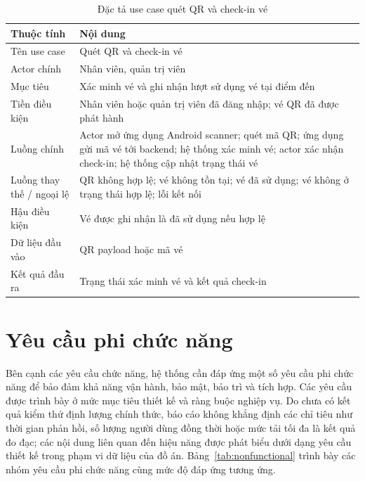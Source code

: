 ﻿\documentclass[../DoAn.tex]{subfiles}
\begin{document}
\begin{table}[H]
\centering
\caption{Đặc tả use case quét QR và check-in vé}
\label{tab:uc-checkin}
\small
\renewcommand{\arraystretch}{1.15}
\setlength{\tabcolsep}{4pt}
\begin{tabularx}{\textwidth}{|L{3.4cm}|Y|}
\hline
\textbf{Thuộc tính} & \textbf{Nội dung} \\
\hline
Tên use case & Quét QR và check-in vé \\
\hline
Actor chính & Nhân viên, quản trị viên \\
\hline
Mục tiêu & Xác minh vé và ghi nhận lượt sử dụng vé tại điểm đến \\
\hline
Tiền điều kiện & Nhân viên hoặc quản trị viên đã đăng nhập; vé QR đã được phát hành \\
\hline
Luồng chính & Actor mở ứng dụng Android scanner; quét mã QR; ứng dụng gửi mã vé tới backend; hệ thống xác minh vé; actor xác nhận check-in; hệ thống cập nhật trạng thái vé \\
\hline
Luồng thay thế / ngoại lệ & QR không hợp lệ; vé không tồn tại; vé đã sử dụng; vé không ở trạng thái hợp lệ; lỗi kết nối \\
\hline
Hậu điều kiện & Vé được ghi nhận là đã sử dụng nếu hợp lệ \\
\hline
Dữ liệu đầu vào & QR payload hoặc mã vé \\
\hline
Kết quả đầu ra & Trạng thái xác minh vé và kết quả check-in \\
\hline
\end{tabularx}
\end{table}

\section{Yêu cầu phi chức năng}

Bên cạnh các yêu cầu chức năng, hệ thống cần đáp ứng một số yêu cầu phi chức năng để bảo đảm khả năng vận hành, bảo mật, bảo trì và tích hợp. Các yêu cầu được trình bày ở mức mục tiêu thiết kế và ràng buộc nghiệp vụ. Do chưa có kết quả kiểm thử định lượng chính thức, báo cáo không khẳng định các chỉ tiêu như thời gian phản hồi, số lượng người dùng đồng thời hoặc mức tải tối đa là kết quả đo đạc; các nội dung liên quan đến hiệu năng được phát biểu dưới dạng yêu cầu thiết kế trong phạm vi dữ liệu của đồ án. Bảng~\ref{tab:nonfunctional} trình bày các nhóm yêu cầu phi chức năng cùng mức độ đáp ứng tương ứng.
\end{document}
